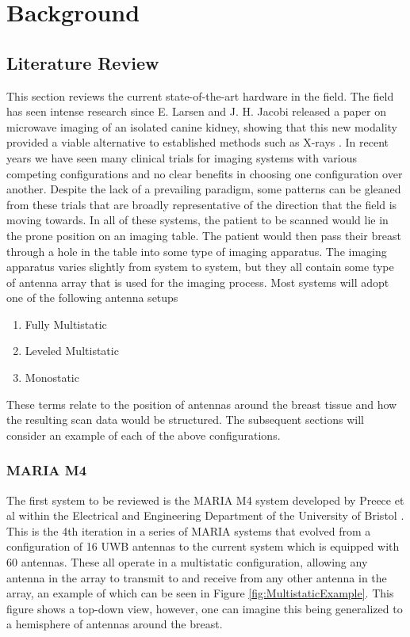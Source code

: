 \chapter*{Background}
\section{Literature Review}
This section reviews the current state-of-the-art hardware in the field. The field has seen intense research since E.
Larsen and J. H. Jacobi released a paper on microwave imaging of an isolated canine kidney, showing that this new
modality provided a viable alternative to established methods such as X-rays
\cite{larsenMicrowaveScatteringParameter1979}. In recent years we have seen many clinical trials for imaging systems
with various competing configurations and no clear benefits in choosing one configuration over another. Despite the lack
of a prevailing paradigm, some patterns can be gleaned from these trials that are broadly representative of the
direction that the field is moving towards. In all of these systems, the patient to be scanned would lie in the prone
position on an imaging table. The patient would then pass their breast through a hole in the table into some type of
imaging apparatus. The imaging apparatus varies slightly from system to system, but they all contain some type of
antenna array that is used for the imaging process. Most systems will adopt one of the following antenna setups
\begin{enumerate}
    \item Fully Multistatic
    \item Leveled Multistatic
    \item Monostatic
\end{enumerate}
\noindent These terms relate to the position of antennas around the breast tissue and how the resulting scan data would
be structured. The subsequent sections will consider an example of each of the above configurations. \hfill \break

\subsection{MARIA M4}
The first system to be reviewed is the MARIA M4 system developed by Preece et al within the Electrical and Engineering
Department of the University of Bristol \cite{preeceMARIAM4Clinical2016}. This is the 4th iteration in a series of MARIA
systems that evolved from a configuration of 16 UWB antennas to the current system which is equipped with 60 antennas.
These all operate in a multistatic configuration, allowing any antenna in the array to transmit to and receive from any
other antenna in the array, an example of which can be seen in Figure \ref{fig:MultistaticExample}. This figure shows a
top-down view, however, one can imagine this being generalized to a hemisphere of antennas around the breast. \hfill

